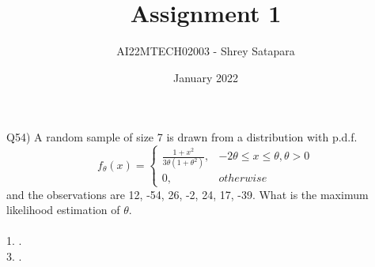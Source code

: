 \documentclass{article}
\title{Assignment 1}
\author{AI22MTECH02003 - Shrey Satapara}
\date{January 2022}
\begin{document}
\maketitle

\paragraph{}
Q54) A random sample of size 7 is drawn from a distribution with p.d.f. \\ 
\[
    f_\theta(x)= 
\begin{cases}
\frac{1 + x^2}{3\theta(1+\theta^2)},& -2\theta \leq x \leq \theta, \theta > 0\\
    0,              & otherwise
\end{cases}
\]
and the observations are 12, -54, 26, -2, 24, 17, -39. What is the maximum likelihood estimation of \(\theta\).
\\\\
1. \quad \quad \quad {}. \\ 3. \quad \quad \quad {}.
\end{document}
